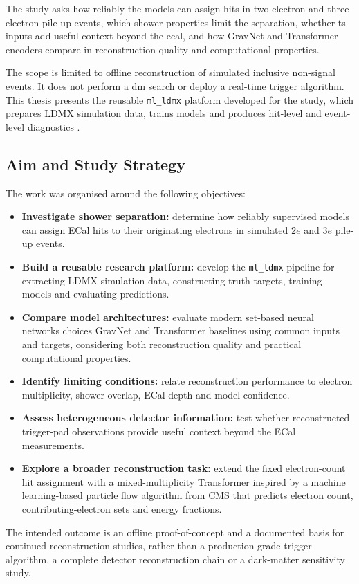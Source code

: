 The study asks how reliably the models can assign hits in two-electron and
three-electron pile-up events, which shower properties limit the separation,
whether \gls{ts} inputs add useful context beyond the \gls{ecal},
and how GravNet and Transformer encoders compare in reconstruction quality and
computational properties.

The scope is limited to offline reconstruction of simulated inclusive
non-signal events. It does not perform a \gls{dm} search or deploy a real-time
trigger algorithm. This thesis presents the reusable
\texttt{ml\_ldmx} platform developed for the study, which prepares LDMX
simulation data, trains models and produces hit-level and event-level
diagnostics \cite{ml_ldmx-github}.

\clearpage
\subsection{Aim and Study Strategy}

The work was organised around the following objectives:

\begin{itemize}
    \item \textbf{Investigate shower separation:} determine how reliably
    supervised models can assign ECal hits to their originating electrons in
    simulated \(2e\) and \(3e\) pile-up events.

    \item \textbf{Build a reusable research platform:} develop the
    \texttt{ml\_ldmx} pipeline for extracting LDMX simulation data,
    constructing truth targets, training models and evaluating predictions.

    \item \textbf{Compare model architectures:} evaluate modern set-based neural networks choices GravNet and Transformer baselines using common inputs and targets, considering both
    reconstruction quality and practical computational properties.

    \item \textbf{Identify limiting conditions:} relate reconstruction
    performance to electron multiplicity, shower overlap, ECal depth and model
    confidence.

    \item \textbf{Assess heterogeneous detector information:} test whether
    reconstructed trigger-pad observations provide useful context beyond the
    ECal measurements.

    \item \textbf{Explore a broader reconstruction task:} extend the fixed electron-count hit assignment with a mixed-multiplicity Transformer inspired by a machine learning-based particle flow algorithm from CMS that predicts electron
    count, contributing-electron sets and energy fractions.
\end{itemize}

The intended outcome is an offline proof-of-concept and a documented basis for
continued reconstruction studies, rather than a production-grade trigger algorithm,
a complete detector reconstruction chain or a dark-matter sensitivity study.

\glsresetall